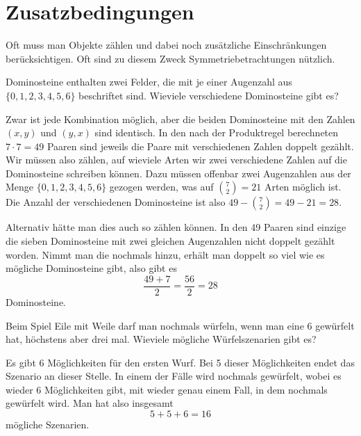 \section{Zusatzbedingungen}
Oft muss man Objekte zählen und dabei noch zusätzliche Einschränkungen
berücksichtigen.
Oft sind zu diesem Zweck Symmetriebetrachtungen
nützlich.

\begin{beispiele}
\item Dominosteine enthalten zwei Felder, die mit je einer Augenzahl
aus $\{0,1,2,3,4,5,6\}$ beschriftet sind.
Wieviele verschiedene Dominosteine
gibt es?

\begin{loesung}
Zwar ist jede Kombination möglich, aber die beiden Dominosteine
mit den Zahlen $(x,y)$ und $(y,x)$ sind identisch.
In den nach der
Produktregel berechneten $7\cdot 7=49$ Paaren sind jeweils die Paare
mit verschiedenen Zahlen doppelt gezählt.
Wir müssen also zählen,
auf wieviele Arten wir zwei verschiedene Zahlen auf die Dominosteine
schreiben können.
Dazu müssen offenbar zwei Augenzahlen aus
der Menge $\{0,1,2,3,4,5,6\}$ gezogen werden, was auf 
$\binom{7}{2}=21$ Arten möglich ist.
Die Anzahl der verschiedenen
Dominosteine ist also $49 - \binom{7}{2}=49-21=28$.

Alternativ hätte man dies auch so zählen können.
In den 49 Paaren sind
einzige die sieben Dominosteine mit zwei gleichen Augenzahlen nicht doppelt
gezählt worden.
Nimmt man die nochmals hinzu, erhält man doppelt so viel
wie es mögliche Dominosteine gibt, also gibt es
\[
\frac{49+7}{2}=\frac{56}2=28
\]
Dominosteine.
\end{loesung}

\item Beim Spiel Eile mit Weile darf man nochmals würfeln, wenn
man eine 6 gewürfelt hat, höchstens aber drei mal.
Wieviele
mögliche Würfelszenarien gibt es?

\begin{loesung}
Es gibt 6 Möglichkeiten für den ersten Wurf.
Bei 5 dieser Möglichkeiten endet das Szenario an dieser Stelle.
In einem der
Fälle wird nochmals gewürfelt, wobei es wieder 6 Möglichkeiten
gibt, mit wieder genau einem Fall, in dem nochmals gewürfelt wird.
Man hat also insgesamt 
\[
5 + 5 + 6=16
\]
mögliche Szenarien.
\end{loesung}

\end{beispiele}

